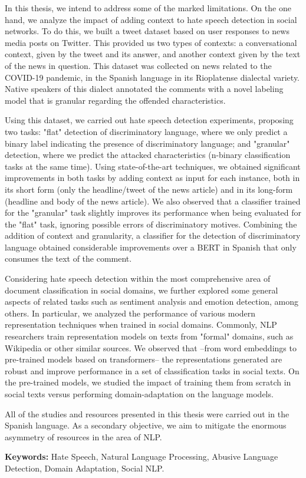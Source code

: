 {In this thesis, we intend to address some of the marked limitations. On the one hand, we analyze the impact of adding context to hate speech detection in social networks. To do this, we built a tweet dataset based on user responses to news media posts on Twitter. This provided us two types of contexts: a conversational context, given by the tweet and its answer, and another context given by the text of the news in question. This dataset was collected on news related to the COVID-19 pandemic, in the Spanish language in its Rioplatense dialectal variety. Native speakers of this dialect annotated the comments with a novel labeling model that is granular regarding the offended characteristics.

Using this dataset, we carried out hate speech detection experiments, proposing two tasks: "flat" detection of discriminatory language, where we only predict a binary label indicating the presence of discriminatory language; and "granular" detection, where we predict the attacked characteristics (n-binary classification tasks at the same time). Using state-of-the-art techniques, we obtained significant improvements in both tasks by adding context as input for each instance, both in its short form (only the headline/tweet of the news article) and in its long-form (headline and body of the news article). We also observed that a classifier trained for the "granular" task slightly improves its performance when being evaluated for the "flat" task, ignoring possible errors of discriminatory motives. Combining the addition of context and granularity, a classifier for the detection of discriminatory language obtained considerable improvements over a BERT in Spanish that only consumes the text of the comment.

Considering hate speech detection within the most comprehensive area of ​​document classification in social domains, we further explored  some general aspects of related tasks such as sentiment analysis and emotion detection, among others. In particular, we analyzed the performance of various modern representation techniques when trained in social domains. Commonly, NLP researchers train representation models on texts from "formal" domains, such as Wikipedia or other similar sources. We observed that –from word embeddings to pre-trained models based on transformers– the representations generated are robust and improve performance in a set of classification tasks in social texts. On the pre-trained models, we studied the impact of training them from scratch in social texts versus performing domain-adaptation on the language models.

All of the studies and resources presented in this thesis were carried out in the Spanish language. As a secondary objective, we aim to mitigate the enormous asymmetry of resources in the area of NLP.
}
\bigskip

\noindent\textbf{Keywords:} Hate Speech, Natural Language Processing, Abusive Language Detection, Domain Adaptation, Social NLP.
